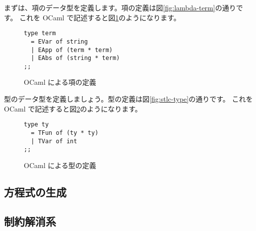 まずは、項のデータ型を定義します。項の定義は図\ref{fig:lambda-term}の通りです。
これを OCaml で記述すると図\ref{fig:ocaml-def-term}のようになります。

\begin{figure}[htbp]
\begin{lstlisting}
type term
  = EVar of string
  | EApp of (term * term)
  | EAbs of (string * term)
;;
\end{lstlisting}
 \caption{OCaml による項の定義}
 \label{fig:ocaml-def-term}
\end{figure}


型のデータ型を定義しましょう。型の定義は図\ref{fig:stlc-type}の通りです。
これを OCaml で記述すると図\ref{fig:ocaml-def-type}のようになります。

\begin{figure}[htbp]
\begin{lstlisting}
type ty
  = TFun of (ty * ty)
  | TVar of int
;;
\end{lstlisting}
 \caption{OCaml による型の定義}
 \label{fig:ocaml-def-type}
\end{figure}

\subsection{方程式の生成}



\subsection{制約解消系}



